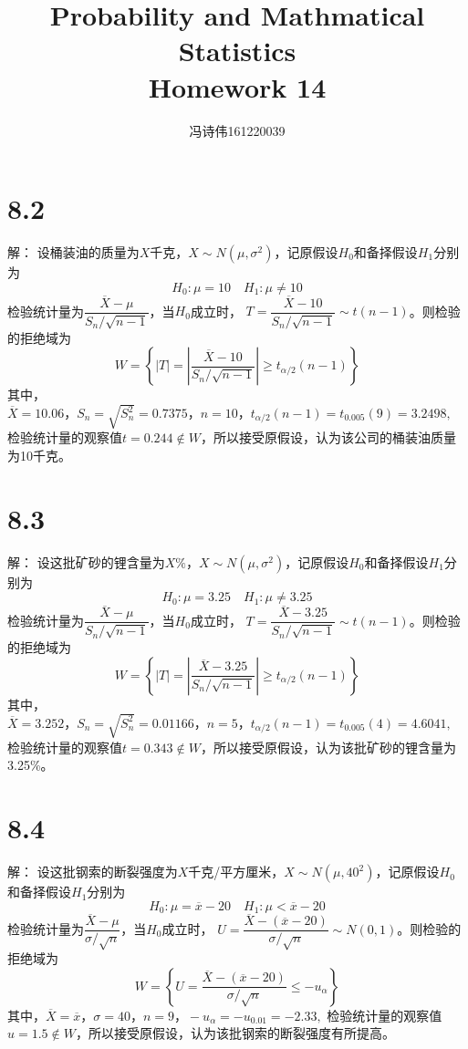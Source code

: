\documentclass[a4papers]{ctexart}
\title{Probability and Mathmatical Statistics \\Homework 14}
\author{冯诗伟161220039}
\date{}
\begin{document}
\maketitle
\section{8.2}
解：
\indent 设桶装油的质量为$X$千克，$X \sim N(\mu,\sigma^2)$，记原假设$H_0$和备择假设$H_1$分别为
\[
    H_0: \mu =10 \quad H_1 :\mu \ne 10
    \]
检验统计量为$\dfrac{\overline X -\mu}{S_n / \sqrt{n-1}}$，当$H_0$成立时，
$T=\dfrac{\overline X -10}{S_n / \sqrt{n-1}}\sim t(n-1)$。则检验的拒绝域为
\[
    W = \left\{ |T|=|\dfrac{\overline X -10}{S_n / \sqrt{n-1}}|\ge t_{\alpha / 2}(n-1) \right\}
    \]
其中，$\overline X=10.06，S_n=\sqrt{S_n^2}=0.7375，n=10，t_{\alpha / 2}(n-1)=t_{0.005}(9)=3.2498,$
检验统计量的观察值$t=0.244\notin W，$所以接受原假设，认为该公司的桶装油质量为10千克。
\section{8.3}
解：
\indent 设这批矿砂的锂含量为$X\%$，$X \sim N(\mu,\sigma^2)$，记原假设$H_0$和备择假设$H_1$分别为
\[
    H_0: \mu =3.25 \quad H_1 :\mu \ne 3.25
    \]
检验统计量为$\dfrac{\overline X -\mu}{S_n / \sqrt{n-1}}$，当$H_0$成立时，
$T=\dfrac{\overline X -3.25}{S_n / \sqrt{n-1}}\sim t(n-1)$。则检验的拒绝域为
\[
    W = \left\{ |T|=|\dfrac{\overline X -3.25}{S_n / \sqrt{n-1}}|\ge t_{\alpha / 2}(n-1) \right\}
    \]
其中，$\overline X=3.252，S_n=\sqrt{S_n^2}=0.01166，n=5，t_{\alpha / 2}(n-1)=t_{0.005}(4)=4.6041,$
检验统计量的观察值$t=0.343\notin W，$所以接受原假设，认为该批矿砂的锂含量为3.25\%。

\section{8.4}
解：
\indent 设这批钢索的断裂强度为$X$千克/平方厘米，$X \sim N(\mu,40^2)$，记原假设$H_0$和备择假设$H_1$分别为
\[
    H_0: \mu =\overline x - 20 \quad H_1 :\mu < \overline x - 20
    \]
检验统计量为$\dfrac{\overline X -\mu}{\sigma / \sqrt{n}}$，当$H_0$成立时，
$U=\dfrac{\overline X -(\overline x - 20)}{\sigma / \sqrt{n}}\sim N(0,1)$。则检验的拒绝域为
\[
    W = \left\{ U=\dfrac{\overline X -(\overline x - 20)}{\sigma / \sqrt{n}} \le -u_{\alpha} \right\}
    \]
其中，$\overline X=\overline x，\sigma = 40，n=9，-u_{\alpha}=-u_{0.01}=-2.33,$
检验统计量的观察值$u=1.5\notin W，$所以接受原假设，认为该批钢索的断裂强度有所提高。
\end{document}
